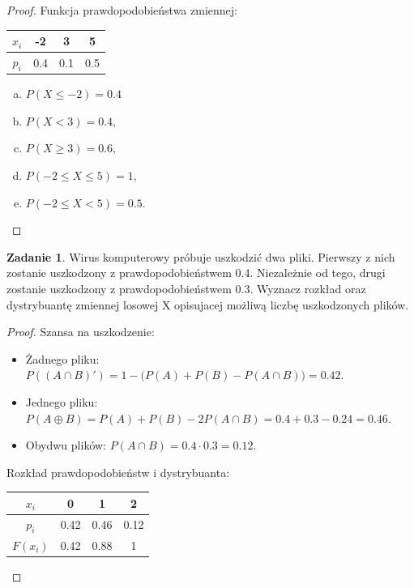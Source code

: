 \documentclass[11pt]{article}
\theoremstyle{definition}
\newtheorem{zadanie}{Zadanie}
\numberwithin{zadanie}{section}
\begin{document}
\begin{proof}
    Funkcja prawdopodobieństwa zmiennej:

    \begin{center}
        \begin{tabular}{ |c|c|c|c| }
            \hline
            $x_i$ & -2  & 3   & 5   \\
            \hline
            $p_i$ & 0.4 & 0.1 & 0.5 \\
            \hline
        \end{tabular}
    \end{center}

    \begin{enumerate}[a)]
        \item $P (X \leq -2) = 0.4$
        \item $P (X < 3) = 0.4,$
        \item $P (X \geq 3) = 0.6,$
        \item $P (-2 \leq X \leq 5) = 1,$
        \item $P (-2 \leq X < 5) = 0.5.$
    \end{enumerate}
\end{proof}

\begin{zadanie}
    Wirus komputerowy próbuje uszkodzić dwa pliki. Pierwszy z nich zostanie uszkodzony z prawdopodobieństwem 0.4.
    Niezależnie od tego, drugi zostanie uszkodzony z prawdopodobieństwem 0.3. Wyznacz rozkład oraz dystrybuantę
    zmiennej losowej X opisujacej możliwą liczbę uszkodzonych plików.
\end{zadanie}
\begin{proof}
    Szansa na uszkodzenie:
    \begin{itemize}
        \item Żadnego pliku: $P((A\cap B)') = 1-\big(P(A)+P(B)-P(A\cap B)\big)  = 0.42$.
        \item Jednego pliku: $P(A\oplus B) = P(A)+P(B)-2P(A\cap B)=0.4+0.3-0.24=0.46$.
        \item Obydwu plików: $P(A\cap B) = 0.4\cdot0.3=0.12$.
    \end{itemize}

    Rozkład prawdopodobieństw i dystrybuanta:

    \begin{center}
        \begin{tabular}{ |c|c|c|c| }
            \hline
            $x_i$    & 0    & 1    & 2    \\
            \hline
            $p_i$    & 0.42 & 0.46 & 0.12 \\
            \hline
            $F(x_i)$ & 0.42 & 0.88 & 1    \\
            \hline
        \end{tabular}
    \end{center}


\end{proof}
\end{document}
